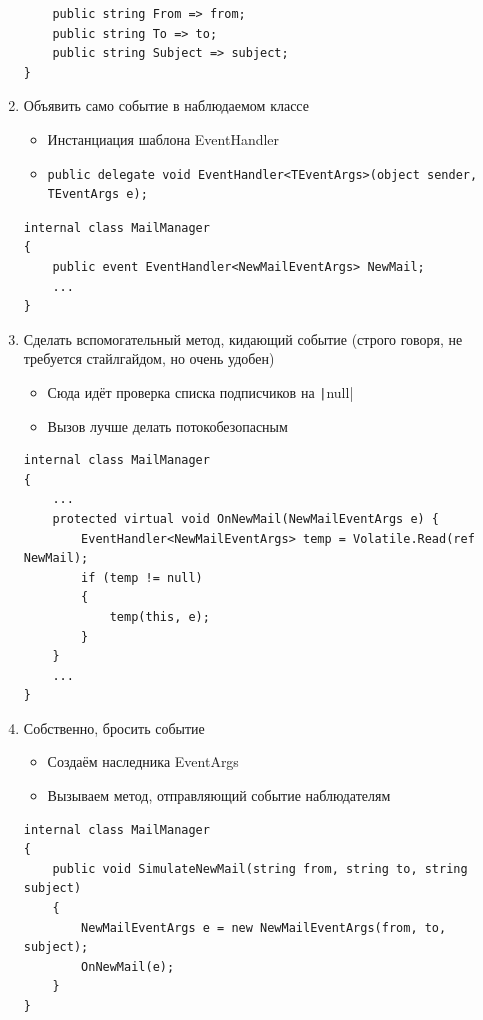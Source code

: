 \documentclass[a5paper]{article}
\begin{document}
\begin{enumerate}
\begin{verbatim}
    public string From => from;
    public string To => to;
    public string Subject => subject;
}
        \end{verbatim}
    \item Объявить само событие в наблюдаемом классе
        \begin{itemize}
            \item Инстанциация шаблона EventHandler
            \item 
                \begin{verbatim}
public delegate void EventHandler<TEventArgs>(object sender, TEventArgs e);
                \end{verbatim}
        \end{itemize}
        \begin{verbatim}
internal class MailManager 
{
    public event EventHandler<NewMailEventArgs> NewMail;
    ...
}
        \end{verbatim}
    \item Сделать вспомогательный метод, кидающий событие (строго говоря, не требуется стайлгайдом, но очень удобен)
        \begin{itemize}
            \item Сюда идёт проверка списка подписчиков на \texttt|null|
            \item Вызов лучше делать потокобезопасным
        \end{itemize}
        \begin{verbatim}
internal class MailManager 
{
    ...
    protected virtual void OnNewMail(NewMailEventArgs e) {
        EventHandler<NewMailEventArgs> temp = Volatile.Read(ref NewMail);
        if (temp != null) 
        {
            temp(this, e);
        }
    }
    ...
}
        \end{verbatim}
    \item Собственно, бросить событие
        \begin{itemize}
            \item Создаём наследника EventArgs
            \item Вызываем метод, отправляющий событие наблюдателям
        \end{itemize}
        \begin{verbatim}
internal class MailManager 
{
    public void SimulateNewMail(string from, string to, string subject) 
    {
        NewMailEventArgs e = new NewMailEventArgs(from, to, subject);
        OnNewMail(e);
    }
}
        \end{verbatim}
\end{enumerate}
\end{document}
